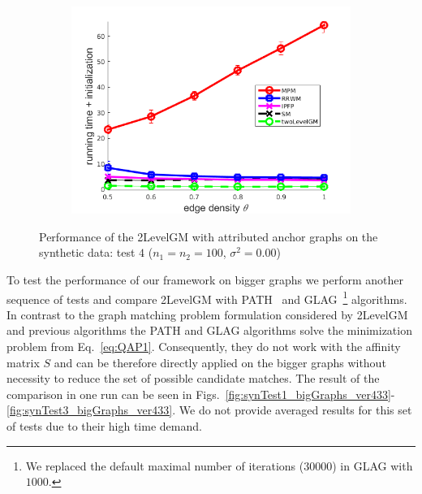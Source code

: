 \begin{figure}[h]
\begin{subfigure}[b]{0.3\textwidth}
			\includegraphics[scale=0.25]{"chapter3/fig/SyntheticTest/descr/Results_v4.3.3/Test4/time_summary_avg10t"} 
		\end{subfigure} 	
	\caption[Performance of the 2LevelGM with attributed anchor graphs on the synthetic data (test $4$)]{Performance of the 2LevelGM with attributed anchor graphs on the synthetic data: test $4$ ($n_1=n_2=100$, $\sigma^2=0.00$)}
	\label{fig:synTest4_descr_ver433}
\end{figure}

To test the performance of our framework on bigger graphs we perform another sequence of tests and compare 2LevelGM with PATH~\cite{Zazlavskiy2008_PATH,code_graphM} and GLAG~\cite{Fiori2013_GLAG,code_GLAG}\footnote{We replaced the default maximal number of iterations ($30000$) in GLAG with $1000$.} algorithms. In contrast to the graph matching problem formulation considered by 2LevelGM and previous algorithms the PATH and GLAG algorithms solve the minimization problem from Eq.~\eqref{eq:QAP1}. Consequently, they do not work with the affinity matrix $S$ and can be therefore directly applied on the bigger graphs without necessity to reduce the set of possible candidate matches. The result of the comparison in one run can be seen in Figs.~\ref{fig:synTest1_bigGraphs_ver433}-\ref{fig:synTest3_bigGraphs_ver433}. We do not provide averaged results for this set of tests due to their high time demand.
\FloatBarrier

